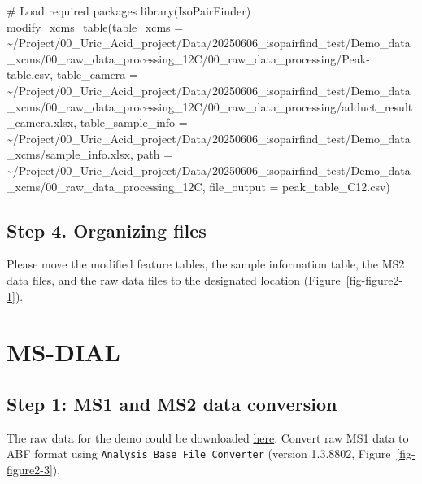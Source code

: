 \documentclass[
  letterpaper,
  DIV=11,
  numbers=noendperiod]{scrreprt}
\newenvironment{Shaded}{\begin{snugshade}}{\end{snugshade}}
\newcommand{\AttributeTok}[1]{\textcolor[rgb]{0.40,0.45,0.13}{#1}}
\newcommand{\CommentTok}[1]{\textcolor[rgb]{0.37,0.37,0.37}{#1}}
\newcommand{\FunctionTok}[1]{\textcolor[rgb]{0.28,0.35,0.67}{#1}}
\newcommand{\NormalTok}[1]{\textcolor[rgb]{0.00,0.23,0.31}{#1}}
\newcommand{\StringTok}[1]{\textcolor[rgb]{0.13,0.47,0.30}{#1}}
\begin{document}
\begin{Shaded}
\begin{Highlighting}[]
\CommentTok{\# Load required packages}
\FunctionTok{library}\NormalTok{(IsoPairFinder)}
\FunctionTok{modify\_xcms\_table}\NormalTok{(}\AttributeTok{table\_xcms =} \StringTok{\textquotesingle{}\textasciitilde{}/Project/00\_Uric\_Acid\_project/Data/20250606\_isopairfind\_test/Demo\_data\_xcms/00\_raw\_data\_processing\_12C/00\_raw\_data\_processing/Peak{-}table.csv\textquotesingle{}}\NormalTok{,}
                  \AttributeTok{table\_camera =} \StringTok{\textquotesingle{}\textasciitilde{}/Project/00\_Uric\_Acid\_project/Data/20250606\_isopairfind\_test/Demo\_data\_xcms/00\_raw\_data\_processing\_12C/00\_raw\_data\_processing/adduct\_result\_camera.xlsx\textquotesingle{}}\NormalTok{,}
                  \AttributeTok{table\_sample\_info =} \StringTok{\textquotesingle{}\textasciitilde{}/Project/00\_Uric\_Acid\_project/Data/20250606\_isopairfind\_test/Demo\_data\_xcms/sample\_info.xlsx\textquotesingle{}}\NormalTok{,}
                  \AttributeTok{path =} \StringTok{\textquotesingle{}\textasciitilde{}/Project/00\_Uric\_Acid\_project/Data/20250606\_isopairfind\_test/Demo\_data\_xcms/00\_raw\_data\_processing\_12C\textquotesingle{}}\NormalTok{,}
                  \AttributeTok{file\_output =} \StringTok{\textquotesingle{}peak\_table\_C12.csv\textquotesingle{}}\NormalTok{)}
\end{Highlighting}
\end{Shaded}

\subsection{Step 4. Organizing files}\label{step-4.-organizing-files}

Please move the modified feature tables, the sample information table,
the MS2 data files, and the raw data files to the designated location
(Figure~\ref{fig-figure2-1}).

\section{MS-DIAL}\label{sec-msdial}

\subsection{Step 1: MS1 and MS2 data
conversion}\label{step-1-ms1-and-ms2-data-conversion}

The raw data for the demo could be downloaded
\href{https://github.com/DoddLab/IsoPairFinder_DemoData_DiffTools/tree/main/00_raw_data}{here}.
Convert raw MS1 data to ABF format using
\texttt{Analysis\ Base\ File\ Converter} (version 1.3.8802,
Figure~\ref{fig-figure2-3}).
\end{document}
